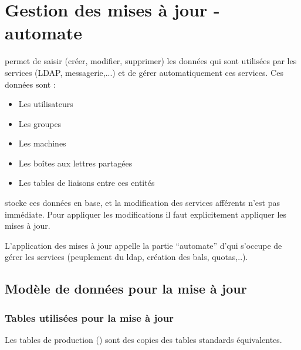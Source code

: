 
\section{Gestion des mises à jour - automate}
\label{update}

\obm permet de saisir (créer, modifier, supprimer) les données qui sont utilisées par les services (LDAP, messagerie,...) et de gérer automatiquement ces services.
Ces données sont :\\
\begin{itemize}
\item Les utilisateurs
\item Les groupes
\item Les machines
\item Les boîtes aux lettres partagées
\item Les tables de liaisons entre ces entités
\end{itemize}
\vspace{0.3cm}

\obm stocke ces données en base, et la modification des services afférents n'est pas immédiate.
Pour appliquer les modifications il faut explicitement appliquer les mises à jour.

L'application des mises à jour appelle la partie ``automate'' d'\obm qui s'occupe de gérer les services (peuplement du ldap, création des bals, quotas,..).


\subsection{Modèle de données pour la mise à jour}

\subsubsection{Tables utilisées pour la mise à jour}

Les tables de production () sont des copies des tables standards équivalentes.\\

